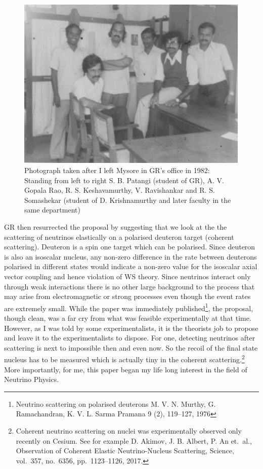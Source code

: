 \begin{figure}[H]
\centering
\includegraphics[scale=.87]{src/images/chap14/002.jpg}
\caption{Photograph taken after I left Mysore in GR’s office in 1982: Standing from left to right S. B. Patangi (student of GR), A. V. Gopala Rao, R. S. Keshavamurthy, V. Ravishankar and R. S. Somashekar (student of D. Krishnamurthy and later faculty in the same department)}\label{chap14-fig002}
\end{figure}

GR then resurrected the proposal by suggesting that we look at the the scattering of neutrinos elastically on a polarised deuteron target (coherent scattering). Deuteron is a spin one target which can be polarised. Since deuteron is also an isoscalar nucleus, any non-zero difference in the rate between deuterons polarised in different states would indicate a non-zero value for the isoscalar axial vector coupling and hence violation of WS theory. Since neutrinos interact only through weak interactions there is no other large background to the process that may arise from electromagnetic or strong processes even though the event rates are extremely small. While the paper was immediately published\footnote{Neutrino scattering on polarised deuterons M. V. N. Murthy, G. Ramachandran, K. V. L. Sarma Pramana 9 (2), 119--127, 1976}, the proposal, though clean, was a far cry from what was feasible experimentally at that time. However, as I was told by some experimentalists, it is the theorists job to propose and leave it to the experimentalists to dispose. For one, detecting neutrinos after scattering is next to impossible then and even now. So the recoil of the final state nucleus has to be measured which is actually tiny in the coherent scattering.\footnote{Coherent neutrino scattering on nuclei was experimentally observed only recently on Cesium. See for example D. Akimov, J. B. Albert, P. An et.\ al., Observation of Coherent Elastic Neutrino-Nucleus Scattering, Science, vol.\ 357, no.\ 6356, pp.\ 1123--1126, 2017.} More importantly, for me, this paper began my life long interest in the field of Neutrino Physics.

